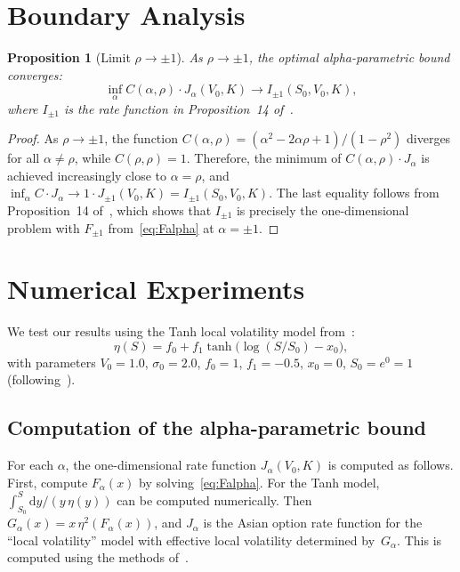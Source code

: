 \documentclass[12pt]{article}
\newtheorem{proposition}[theorem]{Proposition}
\newcommand{\dd}{\mathrm{d}}
\begin{document}
\section{Boundary Analysis}\label{sec:boundary}

\begin{proposition}[Limit $\rho\to\pm 1$]\label{prop:rholimit}
As $\rho\to\pm 1$, the optimal alpha-parametric bound converges:
\[
\inf_\alpha C(\alpha,\rho)\cdot J_\alpha(V_0,K) \to I_{\pm 1}(S_0,V_0,K),
\]
where $I_{\pm 1}$ is the rate function in Proposition~14 of~\cite{PWZ2025}.
\end{proposition}

\begin{proof}
As $\rho\to\pm 1$, the function $C(\alpha,\rho) = (\alpha^2-2\alpha\rho+1)/(1-\rho^2)$
diverges for all $\alpha\neq\rho$, while $C(\rho,\rho)=1$. Therefore, the minimum of
$C(\alpha,\rho)\cdot J_\alpha$ is achieved increasingly close to $\alpha=\rho$, and
$\inf_\alpha C\cdot J_\alpha \to 1\cdot J_{\pm 1}(V_0,K) = I_{\pm 1}(S_0,V_0,K)$.
The last equality follows from Proposition~14 of~\cite{PWZ2025}, which shows that
$I_{\pm 1}$ is precisely the one-dimensional problem with $F_{\pm 1}$
from~\eqref{eq:Falpha} at $\alpha=\pm 1$.
\end{proof}


\section{Numerical Experiments}\label{sec:numerics}

We test our results using the Tanh local volatility model from~\cite{PWZ2025}:
\begin{equation}\label{eq:tanh}
\eta(S) = f_0 + f_1\tanh\bigl(\log(S/S_0) - x_0\bigr),
\end{equation}
with parameters $V_0=1.0$, $\sigma_0=2.0$, $f_0=1$, $f_1=-0.5$, $x_0=0$,
$S_0=e^0=1$ (following~\cite{PWZ2025}).

\subsection{Computation of the alpha-parametric bound}

For each $\alpha$, the one-dimensional rate function $J_\alpha(V_0,K)$ is computed as
follows. First, compute $F_\alpha(x)$ by solving~\eqref{eq:Falpha}. For the Tanh model,
$\int_{S_0}^{S}\dd y/(y\,\eta(y))$ can be computed numerically. Then
$G_\alpha(x) = x\,\eta^2(F_\alpha(x))$, and $J_\alpha$ is the Asian option rate
function for the ``local volatility'' model with effective local volatility determined
by~$G_\alpha$. This is computed using the methods of~\cite{PZ2023}.
\end{document}
